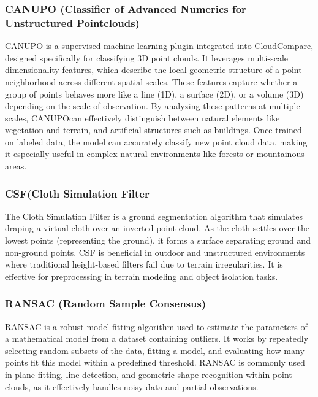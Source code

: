 \documentclass[../report.tex]{subfiles}
\begin{document}
    \subsubsection{\textbf{CANUPO} (Classifier of Advanced Numerics for Unstructured Pointclouds)}

    CANUPO\cite{canupo} is a supervised machine learning plugin integrated into CloudCompare, designed specifically for classifying 3D point clouds. It leverages multi-scale dimensionality features, which describe the local geometric structure of a point neighborhood across different spatial scales. These features capture whether a group of points behaves more like a line (1D), a surface (2D), or a volume (3D) depending on the scale of observation. By analyzing these patterns at multiple scales, CANUPO\cite{canupo2}can effectively distinguish between natural elements like vegetation and terrain, and artificial structures such as buildings. Once trained on labeled data, the model can accurately classify new point cloud data, making it especially useful in complex natural environments like forests or mountainous areas. 
    
    \subsubsection{\textbf{CSF}(Cloth Simulation Filter}
    
    The Cloth Simulation Filter\cite{ClothSF} is a ground segmentation algorithm that simulates draping a virtual cloth over an inverted point cloud. As the cloth settles over the lowest points (representing the ground), it forms a surface separating ground and non-ground points. CSF is beneficial in outdoor and unstructured environments where traditional height-based filters fail due to terrain irregularities. It is effective for preprocessing in terrain modeling and object isolation tasks.
    
    \subsubsection{\textbf{RANSAC} (Random Sample Consensus)}
    
    RANSAC is a robust model-fitting algorithm used to estimate the parameters of a mathematical model from a dataset containing outliers\cite{RANSAC}. It works by repeatedly selecting random subsets of the data, fitting a model, and evaluating how many points fit this model within a predefined threshold. RANSAC is commonly used in plane fitting, line detection, and geometric shape recognition within point clouds, as it effectively handles noisy data and partial observations.
    
\end{document}
